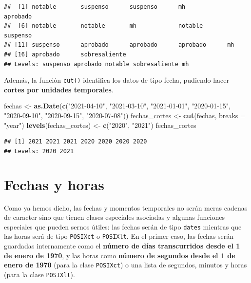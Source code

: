 \documentclass[11pt,]{book}
\newenvironment{Shaded}{\begin{snugshade}}{\end{snugshade}}
\newcommand{\DataTypeTok}[1]{\textcolor[rgb]{0.27,0.27,0.27}{#1}}
\newcommand{\KeywordTok}[1]{\textcolor[rgb]{0.27,0.27,0.27}{\textbf{#1}}}
\newcommand{\NormalTok}[1]{#1}
\newcommand{\StringTok}[1]{\textcolor[rgb]{0.5,0.5,0.5}{#1}}
\begin{document}
\begin{verbatim}
##  [1] notable       suspenso      suspenso      mh            aprobado     
##  [6] notable       notable       mh            notable       suspenso     
## [11] suspenso      aprobado      aprobado      aprobado      mh           
## [16] aprobado      sobresaliente
## Levels: suspenso aprobado notable sobresaliente mh
\end{verbatim}

Además, la función \texttt{cut()} identifica los datos de tipo fecha, pudiendo hacer \textbf{cortes por unidades temporales}.

\begin{Shaded}
\begin{Highlighting}[]
\NormalTok{fechas <-}\StringTok{ }\KeywordTok{as.Date}\NormalTok{(}\KeywordTok{c}\NormalTok{(}\StringTok{"2021-04-10"}\NormalTok{, }\StringTok{"2021-03-10"}\NormalTok{, }\StringTok{"2021-01-01"}\NormalTok{, }\StringTok{"2020-01-15"}\NormalTok{, }\StringTok{"2020-09-10"}\NormalTok{, }\StringTok{"2020-09-15"}\NormalTok{, }\StringTok{"2020-07-08"}\NormalTok{))}
\NormalTok{fechas_cortes <-}\StringTok{ }\KeywordTok{cut}\NormalTok{(fechas, }\DataTypeTok{breaks =} \StringTok{"year"}\NormalTok{)}
\KeywordTok{levels}\NormalTok{(fechas_cortes) <-}\StringTok{ }\KeywordTok{c}\NormalTok{(}\StringTok{"2020"}\NormalTok{, }\StringTok{"2021"}\NormalTok{)}
\NormalTok{fechas_cortes}
\end{Highlighting}
\end{Shaded}

\begin{verbatim}
## [1] 2021 2021 2021 2020 2020 2020 2020
## Levels: 2020 2021
\end{verbatim}

\hypertarget{fechas-y-horas}{%
\section{Fechas y horas}\label{fechas-y-horas}}

Como ya hemos dicho, las fechas y momentos temporales no serán meras cadenas de caracter sino que tienen clases especiales asociadas y algunas funciones especiales que pueden sernos útiles: las fechas serán de tipo \texttt{dates} mientras que las horas será de tipo \texttt{POSIXct} o \texttt{POSIXlt}. En el primer caso, las fechas serán guardadas internamente como el \textbf{número de días transcurridos desde el 1 de enero de 1970}, y las horas como \textbf{número de segundos desde el 1 de enero de 1970} (para la clase \texttt{POSIXct}) o una lista de segundos, minutos y horas (para la clase \texttt{POSIXlt}).
\end{document}
